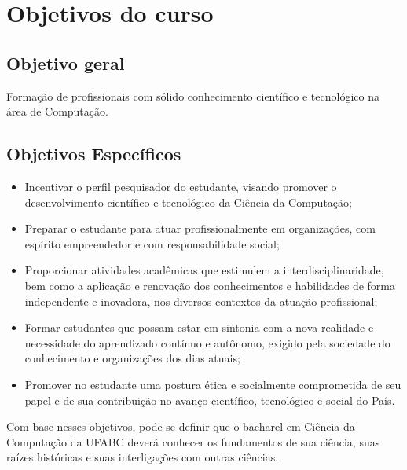 \section{Objetivos do curso}

\subsection{Objetivo geral}

Formação de profissionais com sólido conhecimento científico e tecnológico na
área de Computação.

\subsection{Objetivos Específicos}

\begin{itemize}
    \item Incentivar o perfil pesquisador do estudante, visando promover o
    desenvolvimento científico e tecnológico da Ciência da Computação;
    \item Preparar o estudante para atuar profissionalmente em organizações,
    com espírito empreendedor e com responsabilidade social;
    \item Proporcionar atividades acadêmicas que estimulem a
    interdisciplinaridade, bem como a aplicação e renovação dos conhecimentos e
    habilidades de forma independente e inovadora, nos diversos contextos da
    atuação profissional;
    \item Formar estudantes que possam estar em sintonia com a nova realidade e
    necessidade do aprendizado contínuo e autônomo, exigido pela sociedade do
    conhecimento e organizações dos dias atuais;
    \item Promover no estudante uma postura ética e socialmente comprometida de
    seu papel e de sua contribuição no avanço científico, tecnológico e social
    do País.
\end{itemize}

Com base nesses objetivos, pode-se definir que o bacharel em Ciência da
Computação da UFABC deverá conhecer os fundamentos de sua ciência, suas raízes
históricas e suas interligações com outras ciências.

